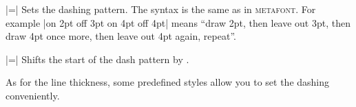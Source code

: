 \begin{itemize}
  |=|
  Sets the dashing pattern. The syntax is the same as in
  \textsc{metafont}. For example |on 2pt off 3pt on 4pt off 4pt| means ``draw
  2pt, then leave out 3pt, then draw 4pt once more, then leave out 4pt
  again, repeat''. 

\begin{codeexample}[]
\begin{tikzpicture}[dash pattern=on 2pt off 3pt on 4pt off 4pt]
  \draw (0pt,0pt) -- (3.5cm,0pt);
\end{tikzpicture}
\end{codeexample}

  |=|
  Shifts the start of the dash pattern by .

\begin{codeexample}[]
\begin{tikzpicture}[dash pattern=on 20pt off 10pt]
  \draw[dash phase=0pt] (0pt,3pt) -- (3.5cm,3pt);
  \draw[dash phase=10pt] (0pt,0pt) -- (3.5cm,0pt);
\end{tikzpicture}
\end{codeexample}
\end{itemize}

As for the line thickness, some predefined styles allow you to set the
dashing conveniently.

